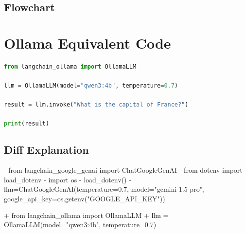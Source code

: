 \documentclass[11pt, a4paper]{article}
\begin{document}
\subsection{Flowchart}

\section{Ollama Equivalent Code}
\begin{lstlisting}[language=Python]
from langchain_ollama import OllamaLLM

llm = OllamaLLM(model="qwen3:4b", temperature=0.7)

result = llm.invoke("What is the capital of France?")

print(result)
\end{lstlisting}

\subsection{Diff Explanation}
\begin{removedcode}
\begin{diffverb}
- from langchain_google_genai import ChatGoogleGenAI
- from dotenv import load_dotenv
- import os
- load_dotenv()
- llm=ChatGoogleGenAI(temperature=0.7, model="gemini-1.5-pro", google_api_key=os.getenv("GOOGLE_API_KEY"))
\end{diffverb}
\end{removedcode}

\begin{addedcode}
\begin{diffverb}
+ from langchain_ollama import OllamaLLM
+ llm = OllamaLLM(model="qwen3:4b", temperature=0.7)
\end{diffverb}
\end{addedcode}
\end{document}
